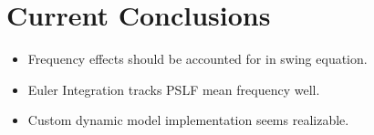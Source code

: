 \documentclass[14pt, unknownkeysallowed]{beamer}
\begin{document}
\section{Current Conclusions}
\begin{frame}
\begin{itemize}
	\item Frequency effects should be accounted for in swing equation.
	\item Euler Integration tracks PSLF mean frequency well.
	\item Custom dynamic model implementation seems realizable. 
\end{itemize}
\end{frame}

\end{document}
